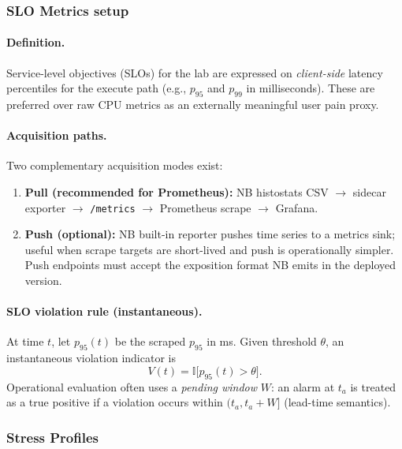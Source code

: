 \documentclass[sigconf]{acmart}
\begin{document}
%
\subsubsection{SLO Metrics setup}
\label{subsubsec:slo}

\paragraph{Definition.}
Service-level objectives (SLOs) for the lab are expressed on \emph{client-side} latency percentiles for the execute path (e.g., $p_{95}$ and $p_{99}$ in milliseconds). These are preferred over raw CPU metrics as an externally meaningful user pain proxy.

\paragraph{Acquisition paths.}
Two complementary acquisition modes exist:
\begin{enumerate}
  \item \textbf{Pull (recommended for Prometheus):} NB histostats CSV $\rightarrow$ sidecar exporter $\rightarrow$ \texttt{/metrics} $\rightarrow$ Prometheus scrape $\rightarrow$ Grafana.
  \item \textbf{Push (optional):} NB built-in reporter pushes time series to a metrics sink; useful when scrape targets are short-lived and push is operationally simpler. Push endpoints must accept the exposition format NB emits in the deployed version.
\end{enumerate}

\paragraph{SLO violation rule (instantaneous).}
At time $t$, let $p_{95}(t)$ be the scraped $p_{95}$ in ms. Given threshold $\theta$, an instantaneous violation indicator is
\begin{equation}
  V(t) = \mathbb{I}\big[p_{95}(t) > \theta\big].
\end{equation}
Operational evaluation often uses a \emph{pending window} $W$: an alarm at $t_a$ is treated as a true positive if a violation occurs within $(t_a, t_a+W]$ (lead-time semantics).

%
\subsubsection{Stress Profiles}
\label{subsubsec:profiles}
\end{document}

